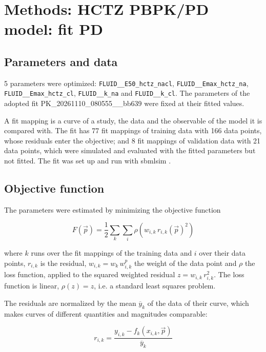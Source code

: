 \section{Methods: HCTZ PBPK/PD model: fit PD}

\subsection{Parameters and data}

5 parameters were optimized: \texttt{FLUID\_\_E50\_hctz\_nacl}, \texttt{FLUID\_\_Emax\_hctz\_na}, \texttt{FLUID\_\_Emax\_hctz\_cl}, \texttt{FLUID\_\_k\_na} and \texttt{FLUID\_\_k\_cl}. The parameters of the adopted fit PK\_20261110\_080555\_\_bb639 were fixed at their fitted values.

A fit mapping is a curve of a study, the data and the observable of the model it is compared with. The fit has 77 fit mappings of training data with 166 data points, whose residuals enter the objective; and 8 fit mappings of validation data with 21 data points, which were simulated and evaluated with the fitted parameters but not fitted. The fit was set up and run with sbmlsim \cite{Koenig2026_sbmlsim}.

\subsection{Objective function}

The parameters were estimated by minimizing the objective function

\begin{equation}
F(\vec{p}) = \frac{1}{2} \sum_{k} \sum_{i} \rho\left(w_{i,k}\, r_{i,k}(\vec{p})^2\right)
\end{equation}

where $k$ runs over the fit mappings of the training data and $i$ over their data points, $r_{i,k}$ is the residual, $w_{i,k} = w_k\, w^{p}_{i,k}$ the weight of the data point and $\rho$ the loss function, applied to the squared weighted residual $z = w_{i,k}\, r_{i,k}^2$. The loss function is linear, $\rho(z) = z$, i.e. a standard least squares problem.

The residuals are normalized by the mean $\overline{y}_k$ of the data of their curve, which makes curves of different quantities and magnitudes comparable:

\begin{equation}
r_{i,k} = \frac{y_{i,k} - f_k(x_{i,k}, \vec{p})}{\overline{y}_k}
\end{equation}

